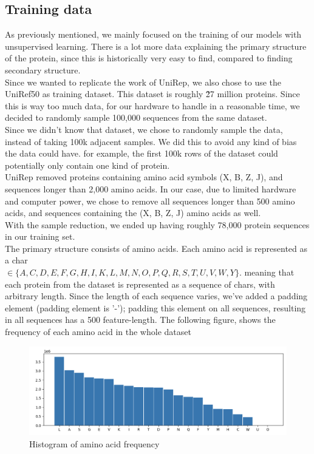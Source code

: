 \subsection{Training data}
As previously mentioned, we mainly focused on the training of our models with unsupervised learning. There is a lot more data explaining the primary structure of the protein, since this is historically very easy to find, compared to finding secondary structure. \\

\noindent
Since we wanted to replicate the work of UniRep, we also chose to use the UniRef50 as training dataset. This dataset is roughly \~27 million proteins. Since this is way too much data, for our hardware to handle in a reasonable time, we decided to randomly sample 100,000 sequences from the same dataset. \\
Since we didn't know that dataset, we chose to randomly sample the data, instead of taking 100k adjacent samples. We did this to avoid any kind of bias the data could have. for example, the first 100k rows of the dataset could potentially only contain one kind of protein.\\

\noindent
UniRep removed proteins containing amino acid symbols (X, B, Z, J), and sequences longer than 2,000 amino acids\cite{unirep}. In our case, due to limited hardware and computer power, we chose to remove all sequences longer than 500 amino acids, and sequences containing the (X, B, Z, J) amino acids as well.\\

\noindent
With the sample reduction, we ended up having roughly 78,000 protein sequences in our training set.\\

\noindent
The primary structure consists of amino acids. Each amino acid is represented as a char \\ $\in \{A, C, D, E, F, G, H, I, K, L, M, N, O, P, Q, R, S, T, U, V, W, Y\}$. meaning that each protein from the dataset is represented as a sequence of chars, with arbitrary length. Since the length of each sequence varies, we've added a padding element (padding element is '-'); padding this element on all sequences, resulting in all sequences has a 500 feature-length. The following figure, shows the frequency of each amino acid in the whole dataset\\

\begin{figure}[!ht]
  \centering
  \includegraphics[scale=0.4]{latex/imgs/aminoFreq.png}
  \caption{Histogram of amino acid frequency}\label{Baseline:before}
\end{figure}

